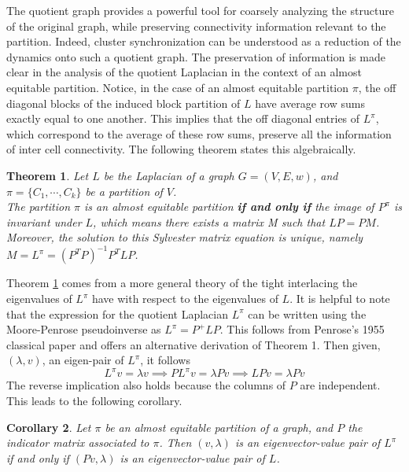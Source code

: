 \documentclass[%
 aip,
 amsmath,amssymb,
preprint,
reprint, onecolumn %
]{revtex4-1}
\newtheorem{theorem}{Theorem}
\newtheorem{cor}[theorem]{Corollary}
\begin{document}
The quotient graph provides a powerful tool for coarsely analyzing the structure of the original graph, while preserving connectivity information relevant to the partition. Indeed, cluster synchronization can be understood as a reduction of the dynamics onto such a quotient graph.\cite{schaub_graph_2016} The preservation of information is made clear in the analysis of the quotient Laplacian in the context of an almost equitable partition. Notice, in the case of an almost equitable partition $\pi$, the off diagonal blocks of the induced block partition of $L$ have average row sums exactly equal to one another. This implies that the off diagonal entries of $L^\pi$, which correspond to the average of these row sums, preserve all the information of inter cell connectivity. The following theorem states this algebraically.

\begin{theorem}\label{thm:quotientAEP}\cite{brouwer2012spectra, cardoso_Laplacian_2007, aguilar_almost_2016} Let $L$ be the Laplacian of a graph $G=(V,E,w)$, and $\pi = \{C_1,\cdots,C_k\}$ be a partition of $V$.\\ The partition $\pi$ is an almost equitable partition \textbf{if and only if} the image of $P^\pi$ is invariant under $L$, which means there exists a matrix M such that $L P = P M$. Moreover, the solution to this Sylvester matrix equation is unique, namely $M = L^{\pi} = (P^TP)^{-1}P^TLP$.
\end{theorem}
Theorem \ref{thm:quotientAEP} comes from a more general theory of the tight interlacing the eigenvalues of $L^\pi$ have with respect to the eigenvalues of $L$.\cite{brouwer2012spectra} 
 It is helpful to note that the expression for the quotient Laplacian $L^{\pi}$ can be written using the Moore-Penrose pseudoinverse as $L^{\pi} = P^{+} L P$. This follows from Penrose's 1955 classical paper\cite{penrose1955generalized} and offers an alternative derivation of Theorem 1. 
Then given, $(\lambda,v )$, an eigen-pair of $L^\pi$, it follows
\[
L^\pi v=\lambda v \implies PL^\pi v = \lambda P v \implies LPv = \lambda Pv
\]
The reverse implication also holds because the columns of $P$ are independent. This leads to the following corollary.

\begin{cor}\label{cor:quotientevec}\cite{brouwer2012spectra,aguilar_almost_2016} 
    Let $\pi$ be an almost equitable partition of a graph, and $P$ the indicator matrix associated to $\pi$. Then $(v,\lambda)$ is an eigenvector-value pair of $L^\pi$ if and only if $(Pv,\lambda)$ is an eigenvector-value pair of $L$.
\end{cor}
\end{document}
